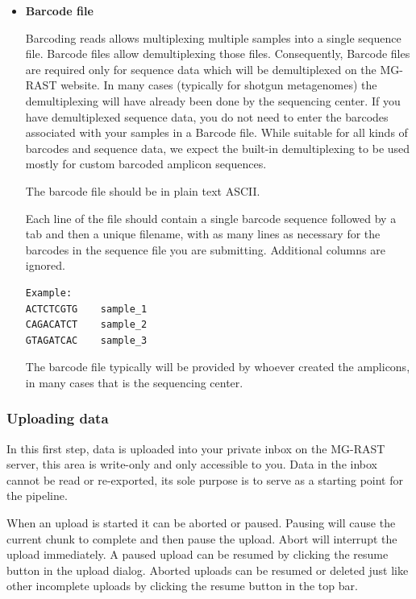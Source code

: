 \documentclass[12pt,fullpage]{report}
\begin{document}
\begin{itemize}
\item {\bf Barcode file}

Barcoding reads allows multiplexing multiple samples into a single sequence file. Barcode files allow demultiplexing those files. Consequently, Barcode files are required only for sequence data which will be demultiplexed on the MG-RAST website. In many cases (typically for shotgun metagenomes) the demultiplexing will have already been done by the sequencing center. If you have demultiplexed sequence data, you do not need to enter the barcodes associated with your samples in a Barcode file. While suitable for all kinds of barcodes and sequence data, we expect the built-in demultiplexing to be used mostly for custom barcoded amplicon sequences. 

The barcode file should be in plain text ASCII.


Each line of the file should contain a single barcode sequence followed by a tab and then a unique filename, with as many lines as necessary for the barcodes in the sequence file you are submitting.  Additional columns are ignored. 
\begin{verbatim}
Example:
ACTCTCGTG    sample_1
CAGACATCT    sample_2
GTAGATCAC    sample_3
\end{verbatim}

The barcode file typically will be provided by whoever created the amplicons, in many cases that is the sequencing center.  
\end{itemize} %


\subsubsection{Uploading data}
In this first step, data is uploaded into your private inbox on the MG-RAST server, this area is write-only and only accessible to you. Data in the inbox cannot be read or re-exported, its sole purpose is to serve as a starting point for the pipeline.

When an upload is started it can be aborted or paused. Pausing will cause the current chunk to complete and then pause the upload. Abort will interrupt the upload immediately. A paused upload can be resumed by clicking the resume button in the upload dialog. Aborted uploads can be resumed or deleted just like other incomplete uploads by clicking the resume button in the top bar.
\end{document}
